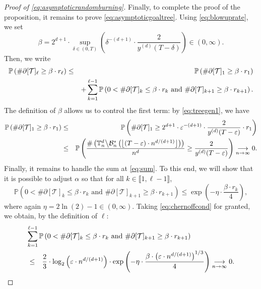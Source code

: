 \documentclass[a4paper,11pt]{article}
\begin{document}
\begin{proof}[Proof of \eqref{eq:asymptoticrandomburning}]
Finally, to complete the proof of the proposition, it remains to prove \eqref{eq:asymptoticgoaltree}.
Using \eqref{eq:blowuprate}, we set
\[\beta=2^{d+1}\cdot\sup_{\delta\in(0,T)}\left(\delta^{-(d+1)}\cdot\frac{2}{y^{(d)}(T-\delta)}\right)\in(0,\infty).\]
Then, we write
\begin{eqnarray}
\mathbb{P}\left(\#\partial[\mathcal{T}]_\ell\geq\beta\cdot r_\ell\right)&\leq&\mathbb{P}\left(\#\partial[\mathcal{T}]_1\geq\beta\cdot r_1\right)\notag\\
&&+\sum_{k=1}^{\ell-1}\mathbb{P}\left(\text{$0<\#\partial[\mathcal{T}]_k\leq\beta\cdot r_k$ and $\#\partial[\mathcal{T}]_{k+1}\geq\beta\cdot r_{k+1}$}\right).\label{eq:sum}
\end{eqnarray}
The definition of $\beta$ allows us to control the first term: by \eqref{eq:treegen1}, we have
\begin{eqnarray*}
\mathbb{P}\left(\#\partial[\mathcal{T}]_1\geq\beta\cdot r_1\right)&\leq&\mathbb{P}\left(\#\partial[\mathcal{T}]_1\geq2^{d+1}\cdot\varepsilon^{-(d+1)}\cdot\frac{2}{y^{(d)}(T-\varepsilon)}\cdot r_1\right)\\
&\leq&\mathbb{P}\left(\frac{\#\left(\mathbb{T}_n^d\middle\backslash\mathcal{B}_n^*\left(\left\lfloor(T-\varepsilon)\cdot n^{d/(d+1)}\right\rfloor\right)\right)}{n^d}\geq\frac{2}{y^{(d)}(T-\varepsilon)}\right)\underset{n\to\infty}{\longrightarrow}0.
\end{eqnarray*}
Finally, it remains to handle the sum at \eqref{eq:sum}.
To this end, we will show that it is possible to adjust $\alpha$ so that for all $k\in\llbracket1,\ell-1\rrbracket$,
\begin{equation}\label{eq:chernoffcond}
\mathbb{P}\left(\text{$0<\#\partial[\mathcal{T}]_k\leq\beta\cdot r_k$ and $\#\partial[\mathcal{T}]_{k+1}\geq\beta\cdot r_{k+1}$}\right)\leq\exp\left(-\eta\cdot\frac{\beta\cdot r_k}{4}\right),
\end{equation}
where again $\eta=2\ln(2)-1\in(0,\infty)$.
Taking \eqref{eq:chernoffcond} for granted, we obtain, by the definition of $\ell$:
\begin{eqnarray*}
\lefteqn{\sum_{k=1}^{\ell-1}\mathbb{P}\left(\text{$0<\#\partial[\mathcal{T}]_k\leq\beta\cdot r_k$ and $\#\partial[\mathcal{T}]_{k+1}\geq\beta\cdot r_{k+1}$}\right)}\\
&\leq&\frac{2}{3}\cdot\log_2\left(\varepsilon\cdot n^{d/(d+1)}\right)\cdot\exp\left(-\eta\cdot\frac{\beta\cdot\left(\varepsilon\cdot n^{d/(d+1)}\right)^{1/3}}{4}\right)\underset{n\to\infty}{\longrightarrow}0.
\end{eqnarray*}

\end{proof}
\end{document}
